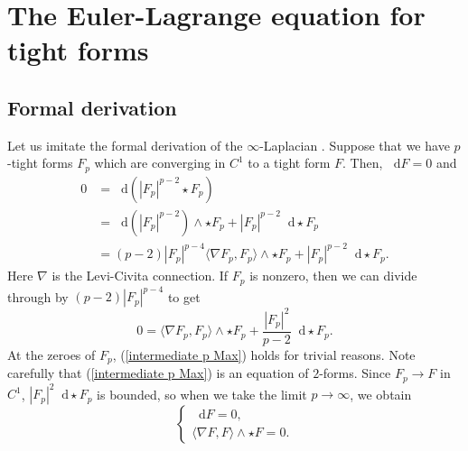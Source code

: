 \documentclass[reqno,11pt]{amsart}
\newcommand*\dif{\mathop{}\!\mathrm{d}}
\theoremstyle{definition}
\numberwithin{equation}{section}
\begin{document}
\section{The Euler-Lagrange equation for tight forms}\label{infinityMax}
\subsection{Formal derivation}
Let us imitate the formal derivation of the $\infty$-Laplacian \cite{Aronsson67}.
Suppose that we have $p$-tight forms $F_p$ which are converging in $C^1$ to a tight form $F$.
Then, $\dif F = 0$ and
\begin{align*}
0
&= \dif(|F_p|^{p - 2} \star F_p) \\
&= \dif(|F_p|^{p - 2}) \wedge \star F_p + |F_p|^{p - 2} \dif \star F_p \\
&= (p - 2) |F_p|^{p - 4} \langle \nabla F_p, F_p\rangle \wedge \star F_p + |F_p|^{p - 2} \dif \star F_p.
\end{align*}
Here $\nabla$ is the Levi-Civita connection.
If $F_p$ is nonzero, then we can divide through by $(p - 2) |F_p|^{p - 4}$ to get
\begin{equation}\label{intermediate p Max}
0 = \langle\nabla F_p, F_p\rangle \wedge \star F_p + \frac{|F_p|^2}{p - 2} \dif \star F_p.
\end{equation}
At the zeroes of $F_p$, (\ref{intermediate p Max}) holds for trivial reasons.
Note carefully that (\ref{intermediate p Max}) is an equation of $2$-forms.
Since $F_p \to F$ in $C^1$, $|F_p|^2 \dif \star F_p$ is bounded, so when we take the limit $p \to \infty$, we obtain 
\begin{equation}\label{infty Max}
\begin{cases}
\dif F = 0, \\
\langle \nabla F, F\rangle \wedge \star F = 0.
\end{cases}
\end{equation}
\end{document}
